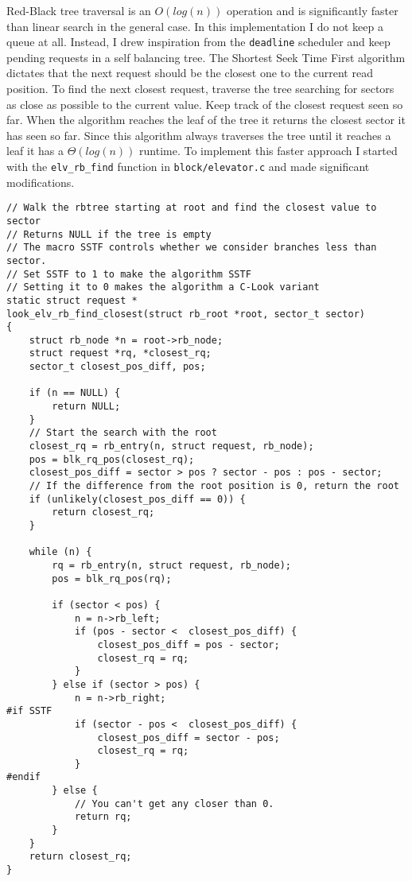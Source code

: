 \documentclass[10pt,conference,draftclsnofoot,onecolumn]{IEEEtran}
\begin{document}
Red-Black tree traversal is an $O(log(n))$ operation and is significantly faster than linear search in the general case. In this implementation I do not keep a queue at all. Instead, I drew inspiration from the \texttt{deadline} scheduler and keep pending requests in a self balancing tree. The Shortest Seek Time First algorithm dictates that the next request should be the closest one to the current read position. To find the next closest request, traverse the tree searching for sectors as close as possible to the current value. Keep track of the closest request seen so far. When the algorithm reaches the leaf of the tree it returns the closest sector it has seen so far. Since this algorithm always traverses the tree until it reaches a leaf it has a $\Theta(log(n))$ runtime. To implement this faster approach I started with the \texttt{elv\_rb\_find} function in \texttt{block/elevator.c} and made significant modifications.

\clearpage
{}
\begin{lstlisting}
// Walk the rbtree starting at root and find the closest value to sector
// Returns NULL if the tree is empty
// The macro SSTF controls whether we consider branches less than sector.
// Set SSTF to 1 to make the algorithm SSTF
// Setting it to 0 makes the algorithm a C-Look variant
static struct request *
look_elv_rb_find_closest(struct rb_root *root, sector_t sector)
{
	struct rb_node *n = root->rb_node;
	struct request *rq, *closest_rq;
	sector_t closest_pos_diff, pos;

	if (n == NULL) {
		return NULL;
	}
	// Start the search with the root
	closest_rq = rb_entry(n, struct request, rb_node);
	pos = blk_rq_pos(closest_rq);
	closest_pos_diff = sector > pos ? sector - pos : pos - sector;
	// If the difference from the root position is 0, return the root
	if (unlikely(closest_pos_diff == 0)) {
		return closest_rq;
	}

	while (n) {
		rq = rb_entry(n, struct request, rb_node);
		pos = blk_rq_pos(rq);

		if (sector < pos) {
			n = n->rb_left;
			if (pos - sector <  closest_pos_diff) {
				closest_pos_diff = pos - sector;
				closest_rq = rq;
			}
		} else if (sector > pos) {
			n = n->rb_right;
#if SSTF
			if (sector - pos <  closest_pos_diff) {
				closest_pos_diff = sector - pos;
				closest_rq = rq;
			}
#endif
		} else {
			// You can't get any closer than 0.
			return rq;
		}
	}
	return closest_rq;
}
\end{lstlisting}
\end{document}
